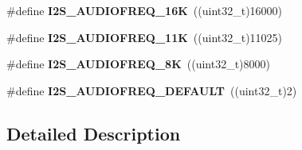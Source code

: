 \begin{DoxyCompactItemize}
\item 
\#define {\bfseries I2\+S\+\_\+\+A\+U\+D\+I\+O\+F\+R\+E\+Q\+\_\+16K}~((uint32\+\_\+t)16000)\hypertarget{group___i2_s___audio___frequency_gac4a77b9683937fbab4b270814a280fab}{}\label{group___i2_s___audio___frequency_gac4a77b9683937fbab4b270814a280fab}

\item 
\#define {\bfseries I2\+S\+\_\+\+A\+U\+D\+I\+O\+F\+R\+E\+Q\+\_\+11K}~((uint32\+\_\+t)11025)\hypertarget{group___i2_s___audio___frequency_gad4123d406d056ee5412f2fefc4959813}{}\label{group___i2_s___audio___frequency_gad4123d406d056ee5412f2fefc4959813}

\item 
\#define {\bfseries I2\+S\+\_\+\+A\+U\+D\+I\+O\+F\+R\+E\+Q\+\_\+8K}~((uint32\+\_\+t)8000)\hypertarget{group___i2_s___audio___frequency_ga111b7c5be04f5d91fbb2ef2bafe755de}{}\label{group___i2_s___audio___frequency_ga111b7c5be04f5d91fbb2ef2bafe755de}

\item 
\#define {\bfseries I2\+S\+\_\+\+A\+U\+D\+I\+O\+F\+R\+E\+Q\+\_\+\+D\+E\+F\+A\+U\+LT}~((uint32\+\_\+t)2)\hypertarget{group___i2_s___audio___frequency_gaed7cf575d5cae24315f18b38ea83310e}{}\label{group___i2_s___audio___frequency_gaed7cf575d5cae24315f18b38ea83310e}

\end{DoxyCompactItemize}


\subsection{Detailed Description}
